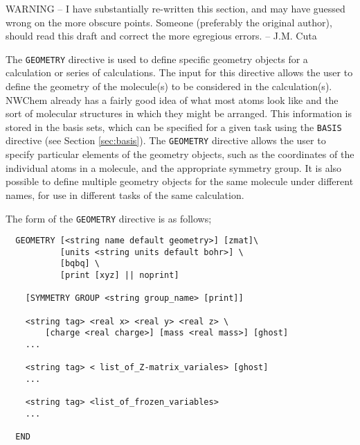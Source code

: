 \label{sec:geom}

\Large
WARNING -- I have substantially re-written this section, and may have
guessed wrong on the more obscure points.  Someone (preferably the original
author), should read this draft and correct the more egregious 
errors. -- J.M. Cuta
\normalsize

The \verb+GEOMETRY+ directive is used to define specific geometry objects
for a calculation or series of calculations.  The input for this directive
allows the user to define the geometry of the molecule(s) to be considered
in the calculation(s).  NWChem already has a fairly good idea of what most
atoms look like and the sort of molecular structures in which they might be
arranged.  This information is stored in the basis sets, which can be specified
for a given task using the \verb+BASIS+ directive (see Section 
\ref{sec:basis}).  The \verb+GEOMETRY+ directive allows the user to specify
particular elements of the geometry objects, such as the coordinates of 
the individual atoms in a molecule, and the appropriate symmetry group.
It is also possible to define multiple geometry objects for the same
molecule under different names, for use in different tasks of the same 
calculation.

The form of the \verb+GEOMETRY+ directive is as follows;

\begin{verbatim}
  GEOMETRY [<string name default geometry>] [zmat]\
           [units <string units default bohr>] \
           [bqbq] \
           [print [xyz] || noprint]
    
    [SYMMETRY GROUP <string group_name> [print]]

    <string tag> <real x> <real y> <real z> \
        [charge <real charge>] [mass <real mass>] [ghost]
    ...

    <string tag> < list_of_Z-matrix_variales> [ghost]
    ...

    <string tag> <list_of_frozen_variables>
    ...

  END
\end{verbatim}


